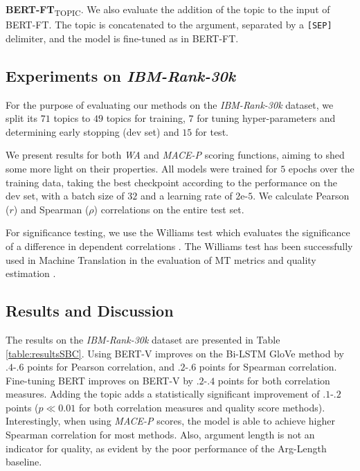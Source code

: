 \documentclass[letterpaper]{article}
\newcommand{\ourds}{IBM-Rank-30k}
\begin{document}
\textbf{BERT-FT}\textsubscript{TOPIC}. We also evaluate the addition of the topic to the input of BERT-FT. The topic is concatenated to the argument, separated by a \verb|[SEP]| delimiter, and the model is fine-tuned as in BERT-FT.

\subsection{Experiments on \textit{\ourds{}}}
\label{experiments}

For the purpose of evaluating our methods on the \textit{\ourds{}} dataset, we split its $71$ topics to $49$ topics for training, $7$ for tuning hyper-parameters and determining early stopping (dev set) and $15$ for test.

We present results for both \textit{WA} and \textit{MACE-P} scoring functions, aiming to shed some more light on their properties. All models were trained for $5$ epochs over the training data, taking the best checkpoint according to the performance on the dev set, with a batch size of $32$ and a learning rate of $2$e-$5$. We calculate Pearson ($r$) and Spearman ($\rho$) correlations on the entire test set.

For significance testing, we use the Williams test \cite{williams59} which evaluates the significance of a difference in dependent correlations \cite{steiger1980tests}. The Williams test has been successfully used in Machine Translation in the evaluation of MT metrics \cite{Graham14} and quality estimation \cite{Graham15}.

\subsection{Results and Discussion}

The results on the \textit{\ourds{}} dataset are presented in Table \ref{table:resultsSBC}. Using BERT-V improves on the Bi-LSTM GloVe method by $.4$-$.6$ points for Pearson correlation, and $.2$-$.6$ points for Spearman correlation. Fine-tuning BERT improves on BERT-V by $.2$-$.4$ points for both correlation measures. Adding the topic adds a statistically significant improvement of $.1$-$.2$ points ($p\ll0.01$ for both correlation measures and quality score methods). Interestingly, when using \textit{MACE-P} scores, the model is able to achieve higher Spearman correlation for most methods. Also, argument length is not an indicator for quality, as evident by the poor performance of the Arg-Length baseline.
\end{document}
